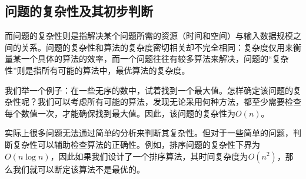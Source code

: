 \subsection{问题的复杂性及其初步判断}

而问题的复杂性则是指解决某个问题所需的资源（时间和空间）与输入数据规模之间的关系。问题的复杂性和算法的复杂度密切相关却不完全相同：复杂度仅用来衡量某一个具体的算法的效率，而一个问题往往有较多算法来解决，问题的“复杂性”则是指所有可能的算法中，最优算法的复杂度。

我们举一个例子：在一些无序的数中，试着找到一个最大值。怎样确定该问题的复杂性呢？我们可以考虑所有可能的算法，发现无论采用何种方法，都至少需要检查每个数值一次，才能确保找到最大值。因此，该问题的复杂性为$O(n)$。

实际上很多问题无法通过简单的分析来判断其复杂性。但对于一些简单的问题，判断复杂性可以辅助检查算法的正确性。例如，排序问题的复杂性下界为$O(n \log n)$，因此如果我们设计了一个排序算法，其时间复杂度为$O(n^2)$，那么我们就可以断定该算法不是最优的。


